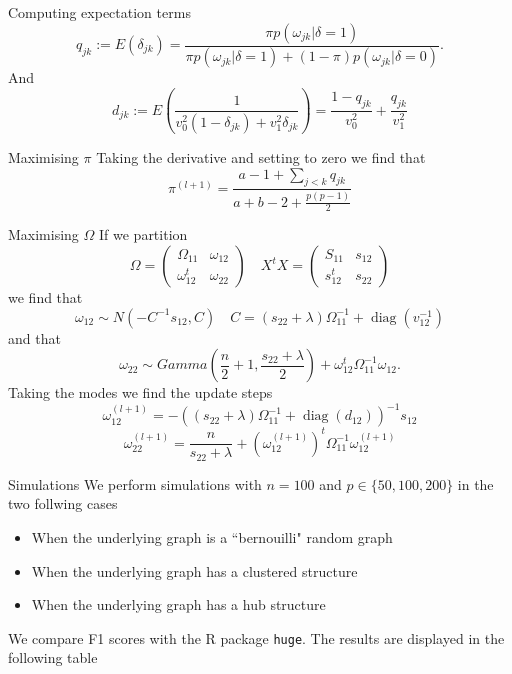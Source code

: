 \documentclass{beamer}
\DeclareMathOperator{\diag}{diag}
\begin{document}
\begin{frame}{Computing expectation terms}
	\[q_{jk} := E(\delta_{jk}) = \frac{\pi p(\omega_{jk} | \delta = 1)}{\pi p(\omega_{jk}
			| \delta = 1) + (1 - \pi) p(\omega_{jk} | \delta = 0)}.\]
	And
	\[ d_{jk} := E\left(\frac{1}{v_0^2 (1 - \delta_{jk}) + v_1^2
				\delta_{jk}}\right) = \frac{1 - q_{jk}}{v_0^2} + \frac{q_{jk}}{v_1^2} \]
\end{frame}
\begin{frame}{Maximising $\pi$}
	Taking the derivative and setting to zero we find that
	\[\pi^{(l+1)} = \frac{a - 1 + \sum_{j<k} q_{jk}}{a + b - 2 + \frac{p(p-1)}{2}}\]
\end{frame}
\begin{frame}{Maximising $\Omega$}
	If we partition
	\[\Omega = \begin{pmatrix}
			\Omega_{11}   & \omega_{12} \\
			\omega_{12}^t & \omega_{22}
		\end{pmatrix}
		\quad
		X^t X = \begin{pmatrix}
			S_{11}   & s_{12} \\
			s_{12}^t & s_{22}
		\end{pmatrix}
	\]
	we find that
	\[\omega_{12} \sim N(-C^{-1}s_{12}, C) \quad C=(s_{22} + \lambda) \Omega_{11}^{-1} + \diag(v_{12}^{-1})\]
	and that
	\[\omega_{22} \sim Gamma\left(\frac{n}{2} + 1, \frac{s_{22} +
			\lambda}{2}\right) + \omega_{12}^t\Omega_{11}^{-1}\omega_{12}.\]
	Taking the modes we find the update steps
	\[\omega_{12}^{(l+1)} = -((s_{22} + \lambda) \Omega_11^{-1} + \diag(d_{12}))^{-1} s_{12} \]
	\[\omega_{22}^{(l+1)} = \frac{n}{s_{22} + \lambda} + (\omega_{12}^{(l+1)})^t \Omega_{11}^{-1}\omega_{12}^{(l+1)}\]
\end{frame}
\begin{frame}{Simulations}
	We perform simulations with $n=100$ and $p \in \{50, 100, 200\}$ in the two
	follwing cases
	\begin{itemize}
		\item When the underlying graph is a ``bernouilli" random graph
		\item When the underlying graph has a clustered structure
		\item When the underlying graph has a hub structure
	\end{itemize}
	We compare F1 scores with the R package \texttt{huge}. The results are displayed in the following table
\end{frame}
\end{document}
